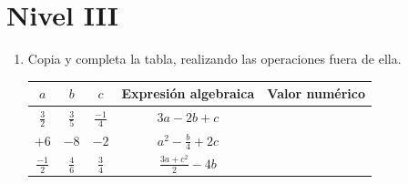 \documentclass[10pt,twoside]{article}
\begin{document}
\section*{Nivel III}
\begin{enumerate}
 \item Copia y completa la tabla, realizando las operaciones fuera de ella.
 \begin{center}
\begin{tabular}{|c|c|c|c|c|@{\vrule height 15pt depth 10pt width 0pt}}\hline
$a$ & $b$ & $c$ & Expresión algebraica & Valor numérico \\ \hline
$\frac{3}{2}$ & $\frac{3}{5}$ & $\frac{-1}{4}$ & $3a-2b+c$ & \\ \hline
$+6$ & $-8$ & $-2$ & $a^{2}-\frac{b}{4}+2c$ & \\ \hline
$\frac{-1}{2}$ & $\frac{4}{6}$ & $\frac{3}{4}$ & $\frac{3a+c^{2}}{2}-4b$ &  \\ \hline
 \end{tabular}
 \end{center}

\end{enumerate}
\end{document}
